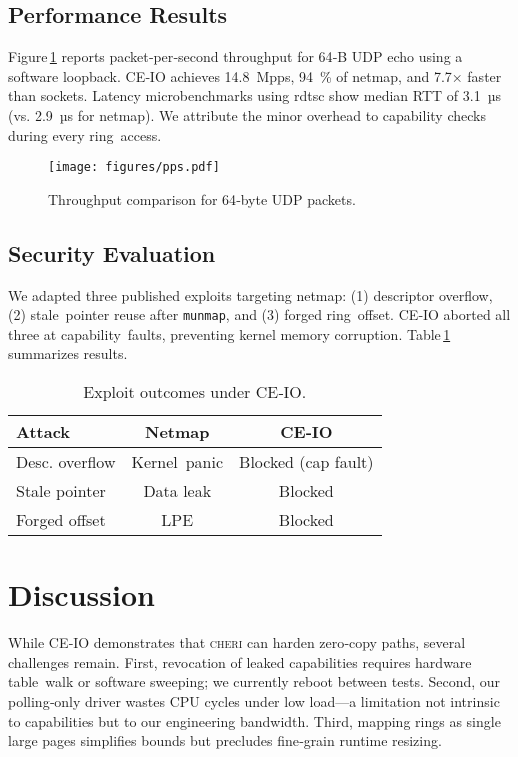 \documentclass[sigconf]{acmart}
\newcommand{\cheri}{\textsc{cheri}\xspace}
\begin{document}
\subsection{Performance Results}
Figure\,\ref{fig:pps} reports packet‑per‑second throughput for 64‑B UDP echo using a software loopback. CE‑IO achieves 14.8 Mpps, 94 \% of netmap, and 7.7× faster than sockets. Latency microbenchmarks using rdtsc show median RTT of 3.1 µs (vs. 2.9 µs for netmap). We attribute the minor overhead to capability checks during every ring access.

\begin{figure}[t]
  \centering
  \texttt{[image: figures/pps.pdf]}
  \caption{Throughput comparison for 64‑byte UDP packets.}
  \label{fig:pps}
\end{figure}

\subsection{Security Evaluation}
We adapted three published exploits targeting netmap: (1) descriptor overflow, (2) stale pointer reuse after \texttt{munmap}, and (3) forged ring offset. CE‑IO aborted all three at capability faults, preventing kernel memory corruption. Table\,\ref{tab:attacks} summarizes results.

\begin{table}[h]
  \caption{Exploit outcomes under CE‑IO.}
  \label{tab:attacks}
  \begin{tabular}{lcc}
    \toprule
    Attack & Netmap & CE‑IO \\
    \midrule
    Desc. overflow & Kernel panic & Blocked (cap fault) \\
    Stale pointer  & Data leak   & Blocked \\
    Forged offset  & LPE         & Blocked \\
    \bottomrule
  \end{tabular}
\end{table}

\section{Discussion}
\label{sec:discussion}
While CE‑IO demonstrates that \cheri can harden zero‑copy paths, several challenges remain. First, revocation of leaked capabilities requires hardware table walk or software sweeping; we currently reboot between tests. Second, our polling‑only driver wastes CPU cycles under low load—a limitation not intrinsic to capabilities but to our engineering bandwidth. Third, mapping rings as single large pages simplifies bounds but precludes fine‑grain runtime resizing.
\end{document}
